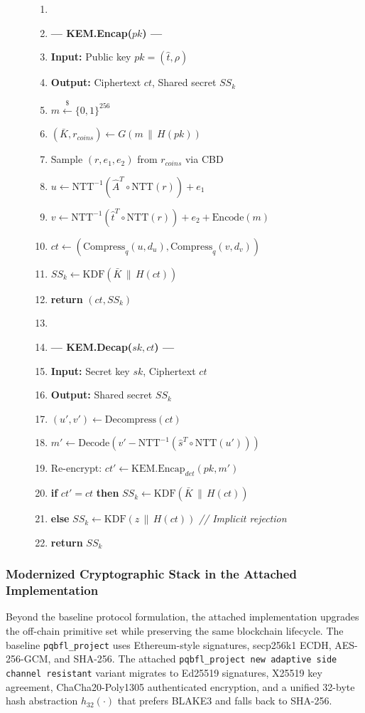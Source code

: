 \documentclass[journal, 10pt, twocolumn]{IEEEtran}
\begin{document}
\begin{figure}[!t]
\begin{enumerate}
    \item[]
    \item[] \textbf{--- KEM.Encap($pk$) ---}
    \item \textbf{Input:} Public key $pk = (\hat{t}, \rho)$
    \item \textbf{Output:} Ciphertext $ct$, Shared secret $SS_k$
    \item $m \xleftarrow{\$} \{0,1\}^{256}$
    \item $(\bar{K}, r_{coins}) \leftarrow G(m \,\|\, H(pk))$
    \item Sample $(r, e_1, e_2)$ from $r_{coins}$ via CBD
    \item $u \leftarrow \text{NTT}^{-1}(\hat{A}^T \circ \text{NTT}(r)) + e_1$
    \item $v \leftarrow \text{NTT}^{-1}(\hat{t}^T \circ \text{NTT}(r)) + e_2 + \text{Encode}(m)$
    \item $ct \leftarrow (\text{Compress}_q(u, d_u), \text{Compress}_q(v, d_v))$
    \item $SS_k \leftarrow \text{KDF}(\bar{K} \,\|\, H(ct))$
    \item \textbf{return} $(ct, SS_k)$
    \item[]
    \item[] \textbf{--- KEM.Decap($sk, ct$) ---}
    \item \textbf{Input:} Secret key $sk$, Ciphertext $ct$
    \item \textbf{Output:} Shared secret $SS_k$
    \item $(u', v') \leftarrow \text{Decompress}(ct)$
    \item $m' \leftarrow \text{Decode}(v' - \text{NTT}^{-1}(\hat{s}^T \circ \text{NTT}(u')))$
    \item Re-encrypt: $ct' \leftarrow \text{KEM.Encap}_{det}(pk, m')$
    \item \textbf{if} $ct' = ct$ \textbf{then} $SS_k \leftarrow \text{KDF}(\bar{K} \,\|\, H(ct))$
    \item \textbf{else} $SS_k \leftarrow \text{KDF}(z \,\|\, H(ct))$ \quad \textit{// Implicit rejection}
    \item \textbf{return} $SS_k$
\end{enumerate}
\hrulefill
\end{figure}

\subsubsection{Modernized Cryptographic Stack in the Attached Implementation}
Beyond the baseline protocol formulation, the attached implementation upgrades the off-chain primitive set while preserving the same blockchain lifecycle. The baseline \texttt{pqbfl\_project} uses Ethereum-style signatures, secp256k1 ECDH, AES-256-GCM, and SHA-256. The attached \texttt{pqbfl\_project new adaptive side channel resistant} variant migrates to Ed25519 signatures, X25519 key agreement, ChaCha20-Poly1305 authenticated encryption, and a unified 32-byte hash abstraction $h_{32}(\cdot)$ that prefers BLAKE3 and falls back to SHA-256.
\end{document}
